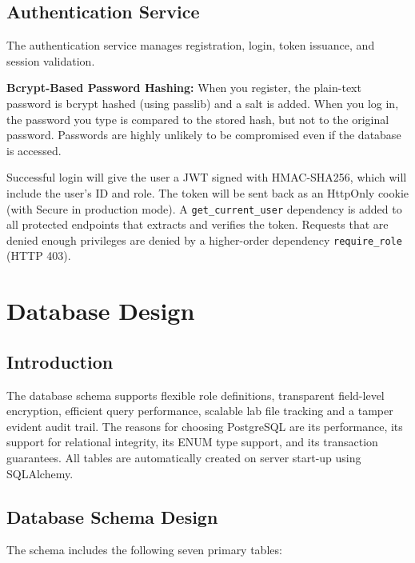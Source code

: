\documentclass[a4paper,12pt]{report}
\begin{document}
\subsection{Authentication Service}

The authentication service manages registration, login, token issuance, and session validation.

\textbf{Bcrypt-Based Password Hashing:} When you register, the plain-text password is bcrypt hashed (using passlib) and a salt is added. When you log in, the password you type is compared to the stored hash, but not to the original password. Passwords are highly unlikely to be compromised even if the database is accessed.

Successful login will give the user a JWT signed with HMAC-SHA256, which will include the user's ID and role. The token will be sent back as an HttpOnly cookie (with Secure in production mode). A \texttt{get\_current\_user} dependency is added to all protected endpoints that extracts and verifies the token. Requests that are denied enough privileges are denied by a higher-order dependency \texttt{require\_role} (HTTP 403).

\section{Database Design}

\subsection{Introduction}

The database schema supports flexible role definitions, transparent field-level encryption, efficient query performance, scalable lab file tracking and a tamper evident audit trail. The reasons for choosing PostgreSQL are its performance, its support for relational integrity, its ENUM type support, and its transaction guarantees. All tables are automatically created on server start-up using SQLAlchemy.

\subsection{Database Schema Design}

The schema includes the following seven primary tables:
\end{document}
